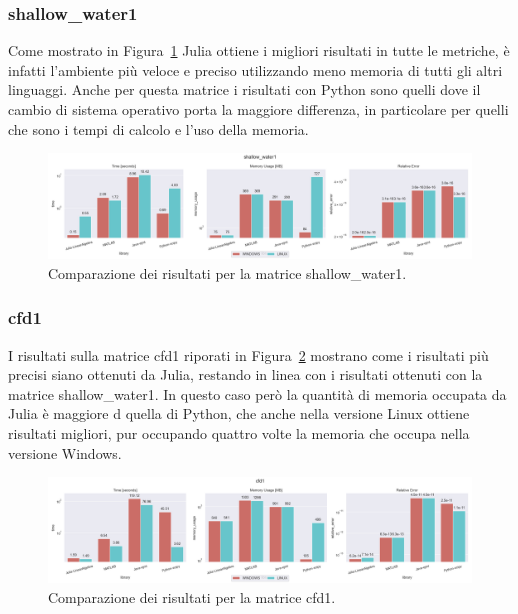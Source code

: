 \documentclass[a4paper, 12pt]{article}
\begin{document}
            \subsubsection{shallow\_water1}
                Come mostrato in Figura~\ref{fig:shallow_water1} Julia ottiene i
                migliori risultati in tutte le metriche, è infatti l'ambiente
                più veloce e preciso utilizzando meno memoria di tutti gli altri
                linguaggi. Anche per questa matrice i risultati con Python sono
                quelli dove il cambio di sistema operativo porta la maggiore 
                differenza, in particolare per quelli che sono i tempi di 
                calcolo e l'uso della memoria.
                \begin{figure}[h]
                    \includegraphics[width=\textwidth]{shallow_water1}
                    \caption{Comparazione dei risultati per la matrice shallow\_water1.}
                    \label{fig:shallow_water1}
                \end{figure}
            \subsubsection{cfd1}
                I risultati sulla matrice cfd1 riporati in Figura~\ref{fig:cfd1}
                mostrano come i risultati più precisi siano ottenuti da Julia,
                restando in linea con i risultati ottenuti con la matrice
                shallow\_water1. In questo caso però la quantità di memoria 
                occupata da Julia è maggiore d quella di Python, che anche nella
                versione Linux ottiene risultati migliori, pur occupando quattro
                volte la memoria che occupa nella versione Windows.
                \begin{figure}[h]
                    \includegraphics[width=\textwidth]{cfd1}
                    \caption{Comparazione dei risultati per la matrice cfd1.}
                    \label{fig:cfd1}
                \end{figure}
\end{document}
